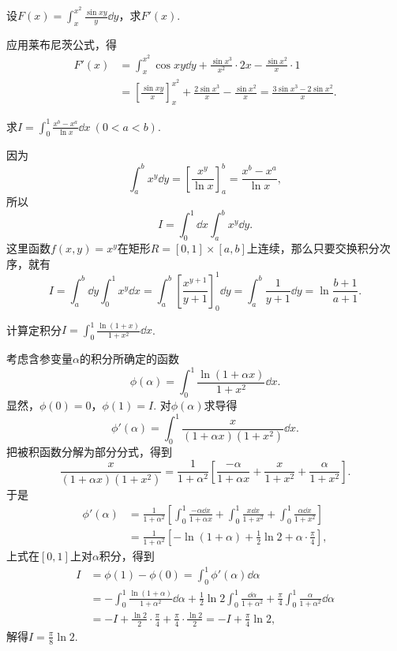 \begin{example}
设\(F(x) = \int_x^{x^2} \frac{\sin xy}{y} \dd{y}\)，求\(F'(x)\).
\begin{solution}
应用莱布尼茨公式，得\begin{align*}
	F'(x) &= \int_x^{x^2} \cos xy \dd{y}
	+ \frac{\sin x^3}{x^2} \cdot 2x
	- \frac{\sin x^2}{x} \cdot 1 \\
	&= \left[ \frac{\sin xy}{x} \right]_x^{x^2}
	+ \frac{2 \sin x^3}{x}
	- \frac{\sin x^2}{x}
	= \frac{3 \sin x^3 - 2 \sin x^2}{x}.
\end{align*}
\end{solution}
\end{example}

\begin{example}
求\(I = \int_0^1 \frac{x^b-x^a}{\ln x} \dd{x}\ (0<a<b)\).
\begin{solution}
因为\[
	\int_a^b x^y \dd{y}
	= \left[ \frac{x^y}{\ln x} \right]_a^b
	= \frac{x^b - x^a}{\ln x},
\]
所以\[
	I = \int_0^1 \dd{x} \int_a^b x^y \dd{y}.
\]
这里函数\(f(x,y) = x^y\)在矩形\(R=[0,1]\times[a,b]\)上连续，那么只要交换积分次序，就有\[
	I = \int_a^b \dd{y} \int_0^1 x^y \dd{x}
	= \int_a^b \left[\frac{x^{y+1}}{y+1}\right]_0^1 \dd{y}
	= \int_a^b \frac{1}{y+1} \dd{y}
	= \ln\frac{b+1}{a+1}.
\]
\end{solution}
\end{example}

\begin{example}
计算定积分\(I = \int_0^1 \frac{\ln(1+x)}{1+x^2} \dd{x}\).
\begin{solution}
考虑含参变量\(\alpha\)的积分所确定的函数\[
	\phi(\alpha) = \int_0^1 \frac{\ln(1+\alpha x)}{1+x^2} \dd{x}.
\]
显然，\(\phi(0) = 0\)，\(\phi(1) = I\).
对\(\phi(\alpha)\)求导得\[
	\phi'(\alpha)
	= \int_0^1 \frac{x}{(1+\alpha x)(1+x^2)} \dd{x}.
\]
把被积函数分解为部分分式，得到\[
	\frac{x}{(1+\alpha x)(1+x^2)}
	= \frac{1}{1+\alpha^2} \left[
		\frac{-\alpha}{1+\alpha x}
		+ \frac{x}{1+x^2}
		+ \frac{\alpha}{1+x^2}
	\right].
\]
于是\begin{align*}
	\phi'(\alpha)
	&= \frac{1}{1+\alpha^2} \left[
	\int_0^1 \frac{-\alpha \dd{x}}{1+\alpha x}
	+ \int_0^1 \frac{x \dd{x}}{1+x^2}
	+ \int_0^1 \frac{\alpha \dd{x}}{1+x^2}
	\right] \\
	&= \frac{1}{1+\alpha^2} \left[
	-\ln(1+\alpha)
	+ \frac{1}{2} \ln2
	+ \alpha \cdot \frac{\pi}{4}
	\right],
\end{align*}
上式在\([0,1]\)上对\(\alpha\)积分，得到\begin{align*}
	I &= \phi(1)-\phi(0)
	= \int_0^1 \phi'(\alpha) \dd{\alpha} \\
	&= - \int_0^1 \frac{\ln(1+\alpha)}{1+\alpha^2} \dd{\alpha}
	+ \frac{1}{2} \ln2 \int_0^1 \frac{\dd{\alpha}}{1+\alpha^2}
	+ \frac{\pi}{4} \int_0^1 \frac{\alpha}{1+\alpha^2} \dd{\alpha} \\
	&= -I + \frac{\ln2}{2} \cdot \frac{\pi}{4} + \frac{\pi}{4}\cdot\frac{\ln2}{2}
	= -I + \frac{\pi}{4} \ln2,
\end{align*}
解得\(I = \frac{\pi}{8} \ln2\).
\end{solution}
\end{example}

